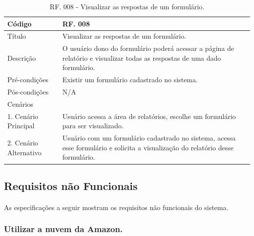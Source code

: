 \documentclass[11pt]{article}
\begin{document}
        \begin{table}[h]
          \begin{center}
            \begin{tabular}{ | p{5cm} | p{10cm} | }
              \hline
              Código\cellcolor{gray} & RF. 008\cellcolor{gray} \\
              \hline
              Título & Visualizar as respostas de um formulário. \\
              \hline
              Descrição & O usuário dono do formulário poderá acessar a página de relatório e visualizar todas as respostas de uma dado formulário. \\
              \hline
              Pré-condições & Existir um formulário cadastrado no sistema. \\
              \hline
              Pós-condições & N/A \\
              \hline
              Cenários &   \\
              \hline
              1.  Cenário Principal & Usuário acessa a área de relatórios, escolhe um formulário para ser visualizado. \\
              \hline
              2.  Cenário Alternativo & Usuário com um formulário cadastrado no sistema, acessa esse formulário e solicita a visualização do relatório desse formulário. \\
              \hline
            \end{tabular}
            \caption{RF. 008 - Visualizar as respostas de um formulário.}
          \end{center}
        \end{table}

    \clearpage

    \subsection{Requisitos não Funcionais}
    
      \paragraph{}
      As especificações a seguir mostram os requisitos não funcionais do sistema.

      \subsubsection{Utilizar a nuvem da Amazon.}
\end{document}
